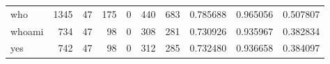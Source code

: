 \begin{longtable}{lrrrrrrrrr}
who       &                                               1345 &                                                 47 &                                                175 &                                                  0 &                                                440 &                                                683 &                                           0.785688 &                               0.965056 &                             0.507807 \\
whoami    &                                                734 &                                                 47 &                                                 98 &                                                  0 &                                                308 &                                                281 &                                           0.730926 &                               0.935967 &                             0.382834 \\
yes       &                                                742 &                                                 47 &                                                 98 &                                                  0 &                                                312 &                                                285 &                                           0.732480 &                               0.936658 &                             0.384097 \\
\end{longtable}
